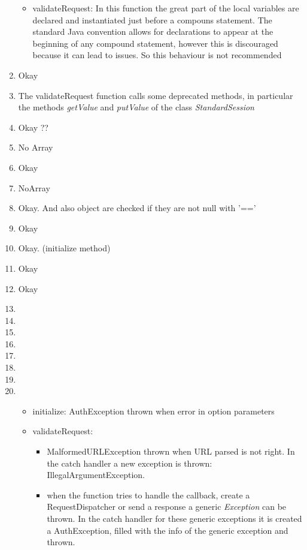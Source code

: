 \begin{enumerate}
\begin{itemize}
                \item validateRequest: In this function the great part of the local variables are declared and instantiated just before a compouns statement. The standard Java convention allows for declarations to appear at the beginning of any compound statement, however this is discouraged because it can lead to issues. So this behaviour is not recommended
            \end{itemize}
        \item Okay
        \item The validateRequest function calls some deprecated methods, in particular the methods \textit{getValue} and \textit{putValue} of the class \textit{StandardSession}
        \item Okay ??
        \item No Array
        \item Okay
        \item NoArray
        \item Okay. And also object are checked if they are not null with '=='
        \item Okay
        \item Okay. (initialize method)
        \item Okay
        \item Okay
        \item 
        \item 
        \item 
        \item 
        \item 
        \item 
        \item 
        \item 
            \begin{itemize}
                \item initialize: AuthException thrown when error in option parameters
                \item validateRequest: 
                    \begin{itemize}
                        \item MalformedURLException thrown when URL parsed is not right. In the catch handler a new exception is thrown: IllegalArgumentException.
                        \item when the function tries to handle the callback, create a RequestDispatcher or send a response a generic \textit{Exception} can be thrown. In the catch handler for these generic exceptions it is created a AuthException, filled with the info of the generic exception and thrown.
                    \end{itemize}
                

\end{itemize}
\end{enumerate}
